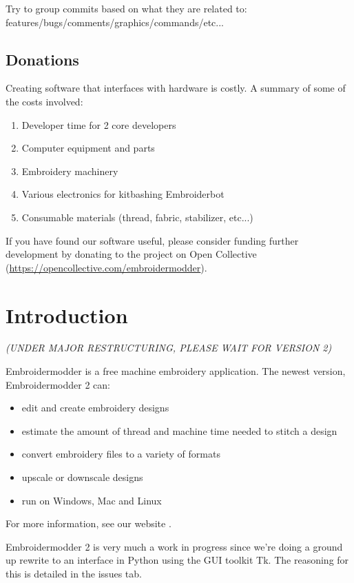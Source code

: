 \documentclass{report}
\begin{document}
Try to group commits based on what they are related to: features/bugs/comments/graphics/commands/etc...

\section{Donations}

Creating software that interfaces with hardware is costly. A summary of some of the costs involved:

\begin{enumerate}
\item Developer time for 2 core developers
\item Computer equipment and parts
\item Embroidery machinery
\item Various electronics for kitbashing Embroiderbot
\item Consumable materials (thread, fabric, stabilizer, etc...)
\end{enumerate}

If you have found our software useful, please consider funding further development by donating to the project on Open Collective (\url{https://opencollective.com/embroidermodder}).

\chapter{Introduction}

\emph{(UNDER MAJOR RESTRUCTURING, PLEASE WAIT FOR VERSION 2)}

Embroidermodder is a free machine embroidery application.
The newest version, Embroidermodder 2 can:

\begin{itemize}
\item edit and create embroidery designs
\item estimate the amount of thread and machine time needed to stitch a design
\item convert embroidery files to a variety of formats
\item upscale or downscale designs
\item run on Windows, Mac and Linux
\end{itemize}

For more information, see our website \cite{thewebsite}.

Embroidermodder 2 is very much a work in progress since we're doing a ground up rewrite to an interface in Python using the GUI toolkit Tk. The reasoning for this is detailed in the issues tab.
\end{document}
